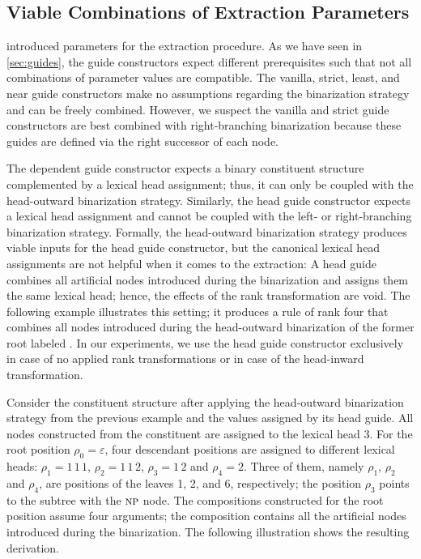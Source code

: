 \documentclass[../../document.tex]{subfiles}
\begin{document}
    \subsection{Viable Combinations of Extraction Parameters}\label{sec:viable-paramters}
     introduced parameters for the extraction procedure.
    As we have seen in \cref{sec:guides}, the guide constructors expect different prerequisites such that not all combinations of parameter values are compatible.
    The vanilla, strict, least, and near guide constructors make no assumptions regarding the binarization strategy and can be freely combined.
    However, we suspect the vanilla and strict guide constructors are best combined with right-branching binarization because these guides are defined via the right successor of each node.

    The dependent guide constructor expects a binary constituent structure complemented by a lexical head assignment; thus, it can only be coupled with the head-outward binarization strategy.
    Similarly, the head guide constructor expects a lexical head assignment and cannot be coupled with the left- or right-branching binarization strategy.
    Formally, the head-outward binarization strategy produces viable inputs for the head guide constructor, but the canonical lexical head assignments are not helpful when it comes to the extraction:
        A head guide combines all artificial nodes introduced during the binarization and assigns them the same lexical head; hence, the effects of the rank transformation are void.
    The following example illustrates this setting; it produces a rule of rank four that combines all nodes introduced during the head-outward binarization of the former root labeled .
    In our experiments, we use the head guide constructor exclusively in case of no applied rank transformations or in case of the head-inward transformation.

    \begin{wrapfigure}[7]{r}{0pt}
        
    \end{wrapfigure}
    Consider the constituent structure after applying the head-outward binarization strategy from the previous example and the values assigned by its head guide.
    All nodes constructed from the  constituent are assigned to the lexical head \(3\).
    For the root position $\rho_0 = \varepsilon$, four descendant positions are assigned to different lexical heads: $\rho_1 = 1\,1\,1$, $\rho_2=1\,1\,2$, $\rho_3 =1\,2$ and $\rho_4=2$.
    Three of them, namely $\rho_1$, $\rho_2$ and $\rho_4$, are positions of the leaves 1, 2, and 6, respectively; the position \(\rho_3\) points to the subtree with the $\textsc{np}$ node.
    The compositions constructed for the root position assume four arguments; the  composition contains all the artificial nodes introduced during the binarization.
    The following illustration shows the resulting derivation.
    \begin{center}
        
    \end{center}
    \exampleqed
\end{document}
